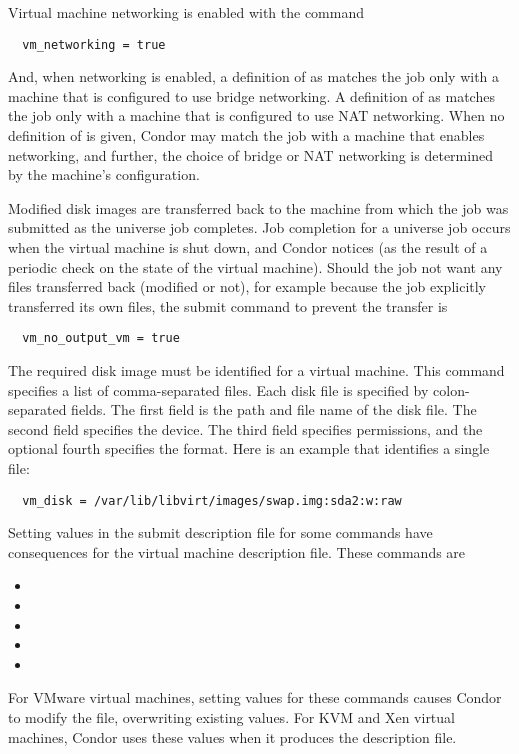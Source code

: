 Virtual machine networking is enabled with the command
\begin{verbatim}
  vm_networking = true
\end{verbatim}
And, when networking is enabled, a definition of
 as 
matches the job only with a machine that is configured to use
bridge networking.
A definition of
 as 
matches the job only with a machine that is configured to use
NAT networking.
When no definition of
 is given,
Condor may
match the job with a machine that enables networking,
and further, the choice of bridge or NAT networking
is determined by the machine's configuration.

Modified disk images are transferred back to the machine from which
the job was submitted as the  universe job completes.
Job completion for a  universe job occurs when 
the virtual machine is shut down, and Condor notices 
(as the result of a periodic check on the state of the virtual machine).
Should the job not want any files transferred back (modified or not),
for example because the job explicitly transferred its own files,
the submit command to prevent the transfer is
\begin{verbatim}
  vm_no_output_vm = true
\end{verbatim}

The required disk image must be identified for a virtual machine.
This  command specifies a list of comma-separated files.
Each disk file is specified by colon-separated fields.
The first field is the path and file name of the disk file.
The second field specifies the device.
The third field specifies permissions, and the optional 
fourth specifies the format.
Here is an example that identifies a single file:
\footnotesize
\begin{verbatim}
  vm_disk = /var/lib/libvirt/images/swap.img:sda2:w:raw
\end{verbatim}
\normalsize

Setting values in the submit description file for some commands
have consequences for the virtual machine description file.
These commands are
\begin{itemize}
  \item {}
  \item {}
  \item {}
  \item {}
  \item {}
\end{itemize}
For VMware virtual machines,
setting values for these commands causes Condor to modify the
 file, overwriting existing values.
For KVM and Xen virtual machines,
Condor uses these values when it produces the description file.


